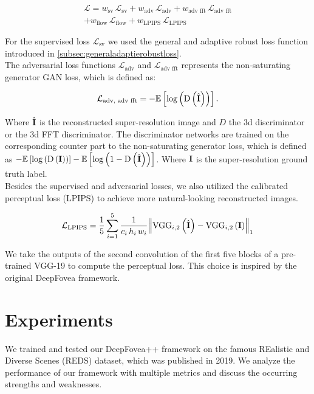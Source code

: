 \documentclass[10pt,twocolumn,letterpaper]{article}
\newcommand{\Tensor}[1]{\boldsymbol{\mathrm{\MakeUppercase{#1}}}}
\newcommand{\Mean}[1]{\mathbb{E}\left[#1\right]}
\begin{document}
\begin{multline} \label{eq:loss}
    \mathcal{L}=w_{\text{sv}}\,\mathcal{L}_{\text{sv}} + w_{\text{adv}}\,\mathcal{L}_{\text{adv}} + w_{\text{adv fft}}\,\mathcal{L}_{\text{adv fft}}\\
    + w_{\text{flow}}\,\mathcal{L}_{\text{flow}} + w_{\text{LPIPS}}\,\mathcal{L}_{\text{LPIPS}}    
\end{multline}

For the supervised loss $\mathcal{L}_{\text{sv}}$ we used the general and adaptive robust loss function introduced in \ref{subsec:generaladaptierobustloss}.\cite{adaptiveroubustloss} \\
The adversarial loss functions $\mathcal{L}_{\text{adv}}$ and $\mathcal{L}_{\text{adv fft}}$ represents the non-saturating generator GAN loss, which is defined as: \cite{gan}

\begin{equation}
    \mathcal{L}_{\text{adv, adv fft}}=-\Mean{\log \left(\operatorname{D}\left(\hat{\Tensor{I}}\right)\right)}.
\end{equation}

Where $\hat{\Tensor{I}}$ is the reconstructed super-resolution image and $D$ the 3d discriminator or the 3d FFT discriminator. The discriminator networks are trained on the corresponding counter part to the non-saturating generator loss, which is defined as $-\Mean{\log\left(\operatorname{D}\left(\Tensor{I}\right)\right)}-\Mean{\log\left(1-\operatorname{
D}\left(\hat{\Tensor{I}}\right)\right)}$. Where $\Tensor{I}$ is the super-resolution ground truth label. \cite{gan}\\
Besides the supervised and adversarial losses, we also utilized the calibrated perceptual loss (LPIPS) \cite{perceptual} to achieve more natural-looking reconstructed images. 

\begin{equation}
    \mathcal{L}_{\text{LPIPS}} = \frac{1}{5}\sum_{i=1}^{5}\frac{1}{c_{i}\,h_{i}\,w_{i}}\norm{\operatorname{VGG}_{i,2}\left(\hat{\Tensor{I}}\right) - \operatorname{VGG}_{i,2}\left(\Tensor{I}\right)}_{1}
\end{equation}

We take the outputs of the second convolution of the first five blocks of a pre-trained VGG-19 to compute the perceptual loss. This choice is inspired by the original DeepFovea framework. \cite{vgg, deepfovea}

\section{Experiments} \label{sec:experiments}
We trained and tested our DeepFovea++ framework on the famous REalistic and Diverse Scenes (REDS) dataset, which was published in 2019. We analyze the performance of our framework with multiple metrics and discuss the occurring strengths and weaknesses.
\end{document}
